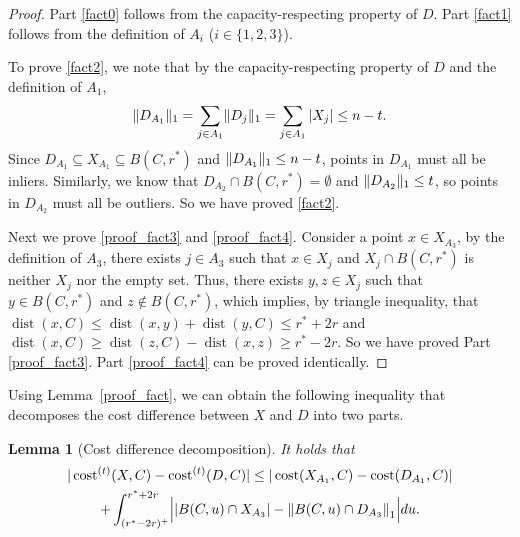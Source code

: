 \documentclass[11pt,letterpaper]{article}
\newtheorem{lemma}[theorem]{Lemma}
\theoremstyle{definition}
\DeclareMathOperator{\dist}{dist}
\DeclarePairedDelimiter{\abs}{\lvert}{\rvert}
\DeclarePairedDelimiter{\norm}{\lVert}{\rVert}
\begin{document}
\begin{proof}
Part \ref{fact0} follows from the capacity-respecting property of $D$. Part \ref{fact1} follows from the definition of $A_i$ ($i\in \{1,2,3\}$).

To prove \ref{fact2}, we note that by the capacity-respecting property of $D$ and the definition of $A_1$,  
\[
    \norm{D_{A_1}}_1 = \sum_{j\in A_1} \norm{D_j}_1 = \sum_{j\in A_1} |X_j|\leq n-t.
\]
Since $D_{A_1}\subseteq  X_{A_1}\subseteq B(C,r^\ast)$ and $\norm{D_{A_1}}_1 \leq n-t$, points in $D_{A_1}$ must all be inliers. Similarly, we know that $D_{A_2}\cap B(C,r^\ast)=\emptyset$ and $\norm{D_{A_2}}_1 \leq t$, so points in $D_{A_2}$ must all be outliers. So we have proved \ref{fact2}.

Next we prove \ref{proof_fact3} and \ref{proof_fact4}. Consider a point $x\in X_{A_3}$, by the definition of $A_3$, there exists $j\in A_3$ such that $x\in X_j$ and $X_j\cap B(C,r^\ast)$ is neither $X_j$ nor the empty set. Thus, there exists $y,z\in X_j$ such that $y\in B(C,r^\ast)$ and $z\not\in B(C,r^\ast)$, which implies, by triangle inequality, that $\dist(x,C)\leq \dist(x,y)+\dist(y,C)\leq r^\ast+2r$ and $\dist(x,C)\geq \dist(z,C)-\dist(x,z)\geq r^\ast-2r$. So we have proved Part \ref{proof_fact3}. Part \ref{proof_fact4} can be proved identically.
\end{proof}

Using Lemma~\ref{proof_fact}, we can obtain the following inequality that decomposes the cost difference between $X$ and $D$ into two parts.

\begin{lemma}[Cost difference decomposition] 
\label{lemma_inq}
It holds that
\begin{multline*}
|\cost[t](X,C)-\cost[t](D,C)|\leq |\cost(X_{A_1},C)-\cost(D_{A_1},C)| \\ +\int_{(r^\ast-2r)^+}^{r^\ast+2r} \abs[\Big]{ |B(C,u)\cap X_{A_3}| - \norm*{B(C,u)\cap D_{A_3}}_1 } du.
\end{multline*}
\end{lemma}
\end{document}

